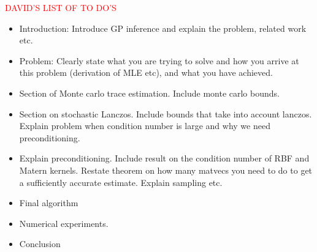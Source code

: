\documentclass{article}
\begin{document}
\textcolor{red}{DAVID'S LIST OF TO DO'S}
\begin{itemize}
    \item Introduction: Introduce GP inference and explain the problem, related work etc.
    \item Problem: Clearly state what you are trying to solve and how you arrive at this problem (derivation of MLE etc), and what you have achieved.
    \item Section of Monte carlo trace estimation. Include monte carlo bounds.
    \item Section on stochastic Lanczos. Include bounds that take into account lanczos. Explain problem when condition number is large and why we need preconditioning.
    \item Explain preconditioning. Include result on the condition number of RBF and Matern kernels. Restate theorem on how many matvecs you need to do to get a sufficiently accurate estimate. Explain sampling etc. 
    \item Final algorithm
    \item Numerical experiments.
    \item Conclusion
\end{itemize}
\end{document}
